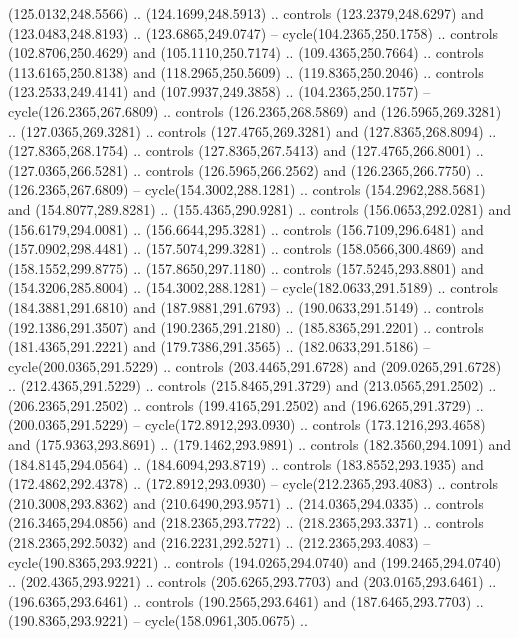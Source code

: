 \begin{scope}[cm={{1.25,0.0,0.0,-1.25,(0.0,743.43331)}}]
    (125.0132,248.5566) .. (124.1699,248.5913) .. controls (123.2379,248.6297) and
    (123.0483,248.8193) .. (123.6865,249.0747) -- cycle(104.2365,250.1758) ..
    controls (102.8706,250.4629) and (105.1110,250.7174) .. (109.4365,250.7664) ..
    controls (113.6165,250.8138) and (118.2965,250.5609) .. (119.8365,250.2046) ..
    controls (123.2533,249.4141) and (107.9937,249.3858) .. (104.2365,250.1757) --
    cycle(126.2365,267.6809) .. controls (126.2365,268.5869) and
    (126.5965,269.3281) .. (127.0365,269.3281) .. controls (127.4765,269.3281) and
    (127.8365,268.8094) .. (127.8365,268.1754) .. controls (127.8365,267.5413) and
    (127.4765,266.8001) .. (127.0365,266.5281) .. controls (126.5965,266.2562) and
    (126.2365,266.7750) .. (126.2365,267.6809) -- cycle(154.3002,288.1281) ..
    controls (154.2962,288.5681) and (154.8077,289.8281) .. (155.4365,290.9281) ..
    controls (156.0653,292.0281) and (156.6179,294.0081) .. (156.6644,295.3281) ..
    controls (156.7109,296.6481) and (157.0902,298.4481) .. (157.5074,299.3281) ..
    controls (158.0566,300.4869) and (158.1552,299.8775) .. (157.8650,297.1180) ..
    controls (157.5245,293.8801) and (154.3206,285.8004) .. (154.3002,288.1281) --
    cycle(182.0633,291.5189) .. controls (184.3881,291.6810) and
    (187.9881,291.6793) .. (190.0633,291.5149) .. controls (192.1386,291.3507) and
    (190.2365,291.2180) .. (185.8365,291.2201) .. controls (181.4365,291.2221) and
    (179.7386,291.3565) .. (182.0633,291.5186) -- cycle(200.0365,291.5229) ..
    controls (203.4465,291.6728) and (209.0265,291.6728) .. (212.4365,291.5229) ..
    controls (215.8465,291.3729) and (213.0565,291.2502) .. (206.2365,291.2502) ..
    controls (199.4165,291.2502) and (196.6265,291.3729) .. (200.0365,291.5229) --
    cycle(172.8912,293.0930) .. controls (173.1216,293.4658) and
    (175.9363,293.8691) .. (179.1462,293.9891) .. controls (182.3560,294.1091) and
    (184.8145,294.0564) .. (184.6094,293.8719) .. controls (183.8552,293.1935) and
    (172.4862,292.4378) .. (172.8912,293.0930) -- cycle(212.2365,293.4083) ..
    controls (210.3008,293.8362) and (210.6490,293.9571) .. (214.0365,294.0335) ..
    controls (216.3465,294.0856) and (218.2365,293.7722) .. (218.2365,293.3371) ..
    controls (218.2365,292.5032) and (216.2231,292.5271) .. (212.2365,293.4083) --
    cycle(190.8365,293.9221) .. controls (194.0265,294.0740) and
    (199.2465,294.0740) .. (202.4365,293.9221) .. controls (205.6265,293.7703) and
    (203.0165,293.6461) .. (196.6365,293.6461) .. controls (190.2565,293.6461) and
    (187.6465,293.7703) .. (190.8365,293.9221) -- cycle(158.0961,305.0675) ..

\end{scope}
